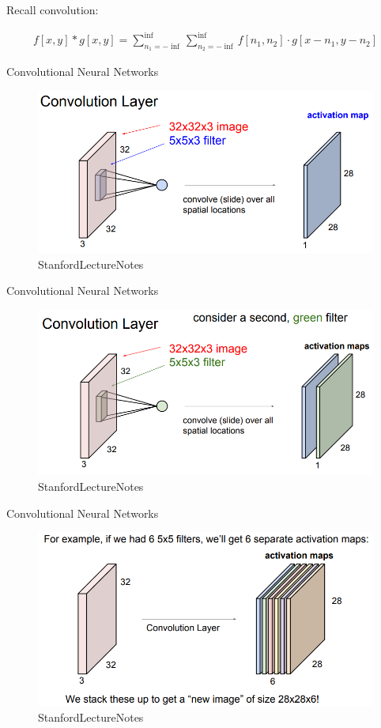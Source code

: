 \documentclass[11pt]{article}
\makeatletter
\def\maxwidth{\ifdim\Gin@nat@width>\linewidth\linewidth
    \else\Gin@nat@width\fi}
\let\Oldincludegraphics\includegraphics
\renewcommand{\includegraphics}[1]{\Oldincludegraphics[width=.8\maxwidth]{#1}}
\makeatother
\begin{document}
    Recall convolution:

\begin{align}
f[x, y] * g[x,y] = \sum_{n_1 = -\inf}^{\inf}\sum_{n_2 = -\inf}^{\inf} f[n_1, n_2]\cdot g[x-n_1, y-n_2]
\end{align}

    Convolutional Neural Networks

\begin{figure}
\centering
\includegraphics{pres_imgs/conv_layer_2.png}
\caption{StanfordLectureNotes}
\end{figure}

    Convolutional Neural Networks

\begin{figure}
\centering
\includegraphics{pres_imgs/conv_layer_3.png}
\caption{StanfordLectureNotes}
\end{figure}

    Convolutional Neural Networks

\begin{figure}
\centering
\includegraphics{pres_imgs/conv_layer_4.png}
\caption{StanfordLectureNotes}
\end{figure}
\end{document}
